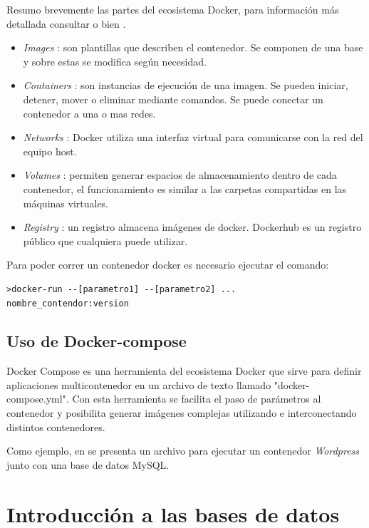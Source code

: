 Resumo brevemente las partes del ecosistema Docker, para información más detallada consultar\citep{WEBSITE:8} o bien \citep{WEBSITE:9}.

\begin{itemize}
\item \textit{Images} : son plantillas que describen el contenedor. Se componen de una base y sobre estas se modifica según necesidad.
\item \textit{Containers} : son instancias de ejecución de una imagen. Se pueden iniciar, detener, mover o eliminar mediante comandos. Se puede conectar un contenedor a una o mas redes.
\item \textit{Networks} : Docker utiliza una interfaz virtual para comunicarse con la red del equipo host.
\item \textit{Volumes} : permiten generar espacios de almacenamiento dentro de cada contenedor, el funcionamiento es similar a las carpetas compartidas en las máquinas virtuales.
\item \textit{Registry} : un registro almacena imágenes de docker. Dockerhub es un registro público que cualquiera puede utilizar.
\end{itemize}

Para poder correr un contenedor docker es necesario ejecutar el comando:
\begin{lstlisting}[label=docker:vControl,caption=Ejecución de contenedor]  
>docker-run --[parametro1] --[parametro2] ...
nombre_contendor:version
\end{lstlisting}


\subsection{Uso de Docker-compose}
\label{subsec:Docker-compose}

Docker Compose es una herramienta del ecosistema Docker que sirve para definir aplicaciones multicontenedor en un archivo de texto llamado "docker-compose.yml". 
Con esta herramienta se facilita el paso de parámetros al contenedor y posibilita generar imágenes complejas utilizando e interconectando distintos contenedores.

Como ejemplo, en \citep{WEBSITE:11} se presenta un archivo para ejecutar un contenedor \textit{Wordpress}  junto con una base de datos MySQL. 

\section{Introducción a las bases de datos}
\label{sec: Introducción a las bases de datos}

